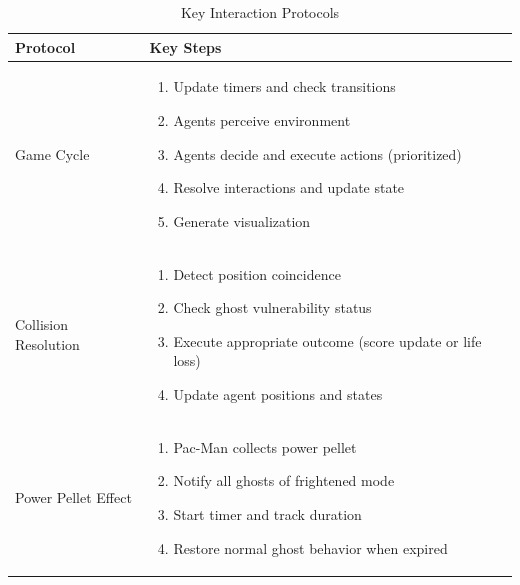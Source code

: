 \documentclass[a4paper, 11pt]{article}
\begin{document}
\begin{table}[h]
\centering
\caption{Key Interaction Protocols}
\begin{tabular}{|p{3.5cm}|p{10.5cm}|}
\hline
\textbf{Protocol} & \textbf{Key Steps} \\
\hline
Game Cycle & 
\begin{enumerate}
    \item Update timers and check transitions
    \item Agents perceive environment
    \item Agents decide and execute actions (prioritized)
    \item Resolve interactions and update state
    \item Generate visualization
\end{enumerate} \\
\hline
Collision Resolution & 
\begin{enumerate}
    \item Detect position coincidence
    \item Check ghost vulnerability status
    \item Execute appropriate outcome (score update or life loss)
    \item Update agent positions and states
\end{enumerate} \\
\hline
Power Pellet Effect & 
\begin{enumerate}
    \item Pac-Man collects power pellet
    \item Notify all ghosts of frightened mode
    \item Start timer and track duration
    \item Restore normal ghost behavior when expired
\end{enumerate} \\
\hline
\end{tabular}
\end{table}
\end{document}
